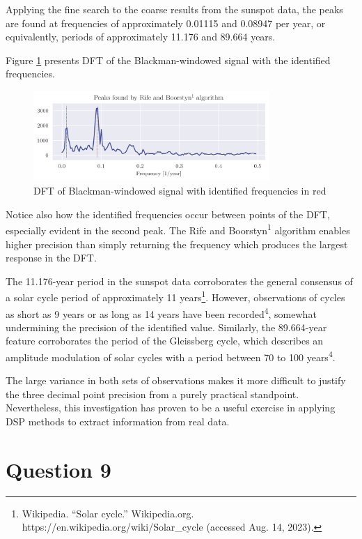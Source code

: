 \documentclass[a4paper, 11pt]{article}
\begin{document}
Applying the fine search to the coarse results from the sunspot data, the peaks
are found at frequencies of approximately 0.01115 and 0.08947 per year, or
equivalently, periods of approximately 11.176 and 89.664 years.

\newpage

Figure \ref{fig:q8_searchresults} presents DFT of the Blackman-windowed signal
with the identified frequencies.

\begin{figure}[ht]
    \centering
    \includegraphics[width=0.8\textwidth]{images/q8_searchresults.png}
    \caption{DFT of Blackman-windowed signal with identified frequencies in red}
    \label{fig:q8_searchresults}
\end{figure}

Notice also how the identified frequencies occur between points of the DFT,
especially evident in the second peak. The Rife and Boorstyn\textsuperscript{1}
algorithm enables higher precision than simply returning the frequency which
produces the largest response in the DFT.

The 11.176-year period in the sunspot data corroborates the general consensus
of a solar cycle period of approximately 11 years\footnote{Wikipedia. ``Solar
cycle.'' Wikipedia.org. https://en.wikipedia.org/wiki/Solar\_cycle (accessed
Aug. 14, 2023).}. However, observations of cycles as short as 9 years or as
long as 14 years have been recorded\textsuperscript{4}, somewhat undermining
the precision of the identified value. Similarly, the 89.664-year feature
corroborates the period of the Gleissberg cycle, which describes an amplitude
modulation of solar cycles with a period between 70 to 100
years\textsuperscript{4}.

The large variance in both sets of observations makes it more difficult to
justify the three decimal point precision from a purely practical standpoint.
Nevertheless, this investigation has proven to be a useful exercise in
applying DSP methods to extract information from real data.

\newpage
\section*{Question 9}
\end{document}

